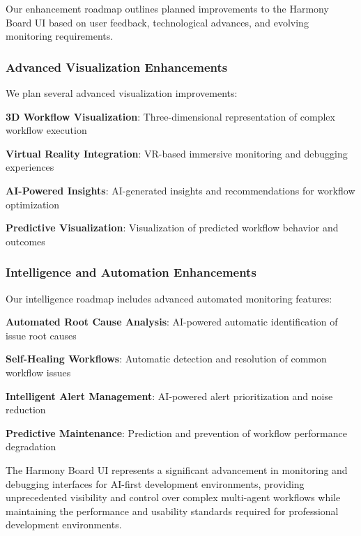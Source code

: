 Our enhancement roadmap outlines planned improvements to the Harmony Board UI based on user feedback, technological advances, and evolving monitoring requirements.

\subsubsection*{Advanced Visualization Enhancements}

We plan several advanced visualization improvements:

\begin{compactlist}
    \item \textbf{3D Workflow Visualization}: Three-dimensional representation of complex workflow execution
    \item \textbf{Virtual Reality Integration}: VR-based immersive monitoring and debugging experiences
    \item \textbf{AI-Powered Insights}: AI-generated insights and recommendations for workflow optimization
    \item \textbf{Predictive Visualization}: Visualization of predicted workflow behavior and outcomes
\end{compactlist}

\subsubsection*{Intelligence and Automation Enhancements}

Our intelligence roadmap includes advanced automated monitoring features:

\begin{expandedlist}
    \item \textbf{Automated Root Cause Analysis}: AI-powered automatic identification of issue root causes
    \item \textbf{Self-Healing Workflows}: Automatic detection and resolution of common workflow issues
    \item \textbf{Intelligent Alert Management}: AI-powered alert prioritization and noise reduction
    \item \textbf{Predictive Maintenance}: Prediction and prevention of workflow performance degradation
\end{expandedlist}

The Harmony Board UI represents a significant advancement in monitoring and debugging interfaces for AI-first development environments, providing unprecedented visibility and control over complex multi-agent workflows while maintaining the performance and usability standards required for professional development environments.
